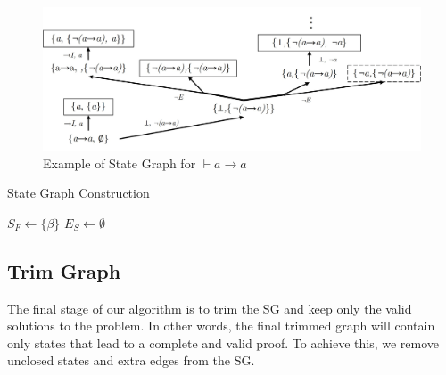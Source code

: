 \documentclass[runningheads]{llncs}
\begin{document}
\vspace{-1em}
\begin{figure}[H]
    \centering
    \includegraphics[width=1\linewidth]{resources/sg-gen.jpg}
    \caption{Example of State Graph for \(\vdash a \to a\)}
    \label{fig:st-ex}
\end{figure}
\vspace{-2em}

\begin{algorithm}[H]
\caption{State Graph Construction}

$S_F \leftarrow \{\beta\}$ 
$E_S \leftarrow \emptyset$ 

\end{algorithm}

\subsection{Trim Graph}

The final stage of our algorithm is to trim the SG and keep only the valid solutions to the problem. In other words, the final trimmed graph will contain only states that lead to a complete and valid proof. To achieve this, we remove unclosed states and extra edges from the SG.
\end{document}

